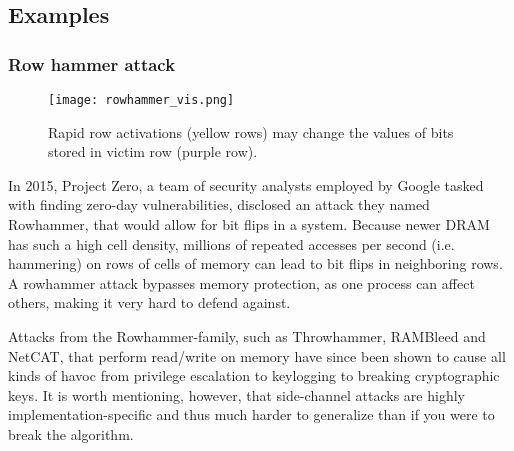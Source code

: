 \subsection{Examples}
\subsubsection{Row hammer attack}
\begin{wrapfigure}{r}{0.4\textwidth}
  \begin{center}
    \texttt{[image: rowhammer\_vis.png]}
  \end{center}
  \caption{Rapid row activations (yellow rows) may change the values of bits stored in victim row (purple row).}
\end{wrapfigure}

In 2015, Project Zero, a team of security analysts employed by Google tasked with finding zero-day vulnerabilities, disclosed an attack they named Rowhammer, that would allow for bit flips in a system.
Because newer DRAM has such a high cell density, millions of repeated accesses per second (i.e. hammering) on rows of cells of memory can lead to bit flips in neighboring rows.
A rowhammer attack bypasses memory protection, as one process can affect others, making it very hard to defend against.

%

Attacks from the Rowhammer-family, such as Throwhammer, RAMBleed and NetCAT, that perform read/write on memory have since been shown to cause all kinds of havoc from privilege escalation to keylogging to breaking cryptographic keys\cite{tatar_throwhammer:_2018}\cite{kwong2020rambleed}\cite{kurth_netcat:_2020}.
It is worth mentioning, however, that side-channel attacks are highly implementation-specific and thus much harder to generalize than if you were to break the algorithm.

